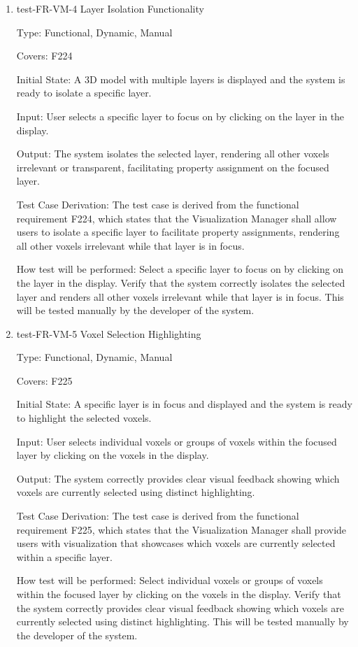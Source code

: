 \documentclass[12pt, titlepage]{article}
\begin{document}
\begin{enumerate}

\item{test-FR-VM-4 Layer Isolation Functionality\\}

Type: Functional, Dynamic, Manual

Covers: F224
					
Initial State: A 3D model with multiple layers is displayed and the system is ready to isolate a specific layer.
					
Input: User selects a specific layer to focus on by clicking on the layer in the display.
					
Output: The system isolates the selected layer, rendering all other voxels irrelevant or transparent, facilitating property assignment on the focused layer.

Test Case Derivation: The test case is derived from the functional requirement F224, which states that the Visualization Manager shall allow users to isolate a specific layer to facilitate property assignments, rendering all other voxels irrelevant while that layer is in focus.
					
How test will be performed: Select a specific layer to focus on by clicking on the layer in the display. Verify that the system correctly isolates the selected layer and renders all other voxels irrelevant while that layer is in focus. This will be tested manually by the developer of the system.

\item{test-FR-VM-5 Voxel Selection Highlighting\\}

Type: Functional, Dynamic, Manual

Covers: F225
					
Initial State: A specific layer is in focus and displayed and the system is ready to highlight the selected voxels.
					
Input: User selects individual voxels or groups of voxels within the focused layer by clicking on the voxels in the display.
					
Output: The system correctly provides clear visual feedback showing which voxels are currently selected using distinct highlighting.

Test Case Derivation: The test case is derived from the functional requirement F225, which states that the Visualization Manager shall provide users with visualization that showcases which voxels are currently selected within a specific layer.
					
How test will be performed: Select individual voxels or groups of voxels within the focused layer by clicking on the voxels in the display. Verify that the system correctly provides clear visual feedback showing which voxels are currently selected using distinct highlighting. This will be tested manually by the developer of the system.

\end{enumerate}
\end{document}
